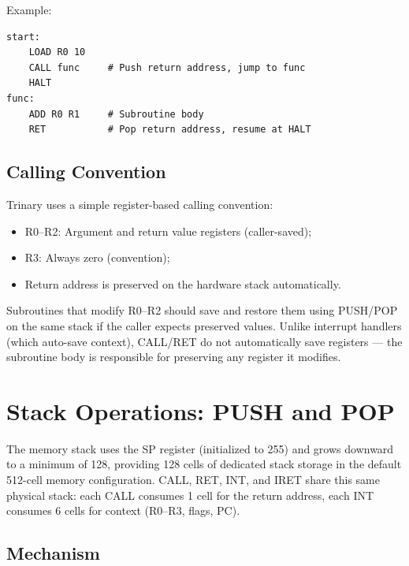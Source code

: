 \documentclass[12pt,a4paper,twoside]{book}
\theoremstyle{trinarytheorem}
\theoremstyle{trinarydefinition}
\begin{document}
Example:
\begin{lstlisting}
start:
    LOAD R0 10
    CALL func     # Push return address, jump to func
    HALT
func:
    ADD R0 R1     # Subroutine body
    RET           # Pop return address, resume at HALT
\end{lstlisting}

\section{Calling Convention}

Trinary uses a simple register-based calling convention:
\begin{itemize}
    \item R0--R2: Argument and return value registers (caller-saved);
    \item R3: Always zero (convention);
    \item Return address is preserved on the hardware stack automatically.
\end{itemize}
Subroutines that modify R0--R2 should save and restore them using PUSH/POP on the
same stack if the caller expects preserved values. Unlike interrupt handlers (which
auto-save context), CALL/RET do not automatically save registers --- the subroutine
body is responsible for preserving any register it modifies.

\chapter{Stack Operations: PUSH and POP}
\label{ch:stack}

The memory stack uses the SP register (initialized to 255) and grows downward to a
minimum of 128, providing 128 cells of dedicated stack storage in the default 512-cell
memory configuration. CALL, RET, INT, and IRET share this same physical stack: each
CALL consumes 1 cell for the return address, each INT consumes 6 cells for context
(R0--R3, flags, PC).

\section{Mechanism}
\end{document}
